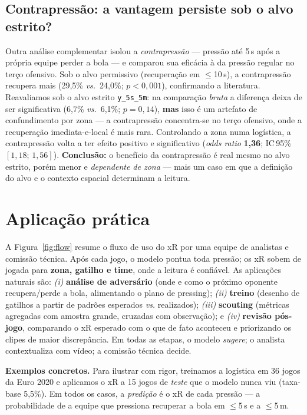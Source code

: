 \documentclass[a4paper,11pt]{article}
\begin{document}
\subsection{Contrapressão: a vantagem persiste sob o alvo estrito?}
Outra análise complementar isolou a \emph{contrapressão} --- pressão até 5\,s após a própria equipe perder a bola --- e comparou sua eficácia à da pressão regular no terço ofensivo. Sob o alvo permissivo (recuperação em $\le$10\,s), a contrapressão recupera mais (29,5\% \emph{vs.}\ 24,0\%; $p<0{,}001$), confirmando a literatura. Reavaliamos sob o alvo estrito \texttt{y\_5s\_5m}: na comparação \emph{bruta} a diferença deixa de ser significativa (6,7\% \emph{vs.}\ 6,1\%; $p=0{,}14$), \textbf{mas} isso é um artefato de confundimento por zona --- a contrapressão concentra-se no terço ofensivo, onde a recuperação imediata-e-local é mais rara. Controlando a zona numa logística, a contrapressão volta a ter efeito positivo e significativo (\emph{odds ratio} \textbf{1,36}; IC\,95\% $[1{,}18;\,1{,}56]$). \textbf{Conclusão:} o benefício da contrapressão é real mesmo no alvo estrito, porém menor e \emph{dependente de zona} --- mais um caso em que a definição do alvo e o contexto espacial determinam a leitura.

\section{Aplicação prática}

A Figura~\ref{fig:flow} resume o fluxo de uso do xR por uma equipe de analistas e comissão técnica. Após cada jogo, o modelo pontua toda pressão; os xR sobem de jogada para \textbf{zona, gatilho e time}, onde a leitura é confiável. As aplicações naturais são: \emph{(i)} \textbf{análise de adversário} (onde e como o próximo oponente recupera/perde a bola, alimentando o plano de pressing); \emph{(ii)} \textbf{treino} (desenho de gatilhos a partir de padrões esperados \emph{vs.} realizados); \emph{(iii)} \textbf{scouting} (métricas agregadas com amostra grande, cruzadas com observação); e \emph{(iv)} \textbf{revisão pós-jogo}, comparando o xR esperado com o que de fato aconteceu e priorizando os clipes de maior discrepância. Em todas as etapas, o modelo \emph{sugere}; o analista contextualiza com vídeo; a comissão técnica decide.

\textbf{Exemplos concretos.} Para ilustrar com rigor, treinamos a logística em 36 jogos da Euro 2020 e aplicamos o xR a 15 jogos de \emph{teste} que o modelo nunca viu (taxa-base 5,5\%). Em todos os casos, a \emph{predição} é o xR de cada pressão --- a probabilidade de a equipe que pressiona recuperar a bola em $\le$5\,s e a $\le$5\,m.
\end{document}
